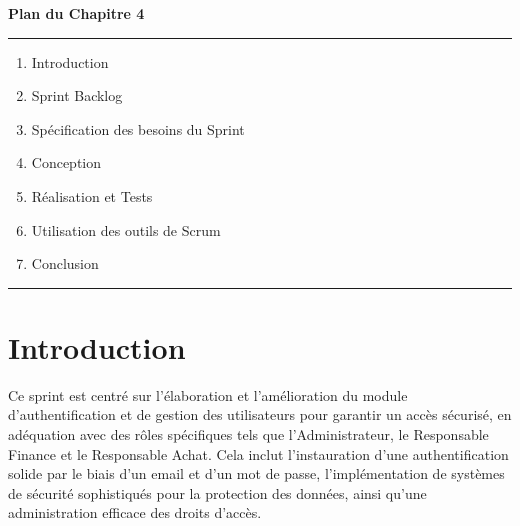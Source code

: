 \documentclass[a4paper,11pt]{report}
\begin{document}
\vspace*{2cm}

\begin{center}
    {\LARGE \textbf{Plan du Chapitre 4}}
\end{center}

\vspace{1cm}

\noindent
\textcolor{gray!70}{\rule{\textwidth}{0.4pt}}

\vspace{1cm}

\begin{enumerate}[label=\textbf{\large\arabic*.}, leftmargin=*, itemsep=1.2em]
    \item Introduction
    \item Sprint Backlog
    \item Spécification des besoins du Sprint
    \item Conception
    \item Réalisation et Tests
    \item Utilisation des outils de Scrum
    \item Conclusion
\end{enumerate}



\vspace{1cm}

\noindent
\textcolor{gray!70}{\rule{\textwidth}{0.4pt}}

\newpage

\setcounter{section}{0}

\section{Introduction}


Ce sprint est centré sur l'élaboration et l'amélioration du module d'authentification et de gestion des utilisateurs pour garantir un accès sécurisé, en adéquation avec des rôles spécifiques tels que l'Administrateur, le Responsable Finance et le Responsable Achat. Cela inclut l'instauration d'une authentification solide par le biais d'un email et d'un mot de passe, l'implémentation de systèmes de sécurité sophistiqués pour la protection des données, ainsi qu'une administration efficace des droits d'accès.
\end{document}
